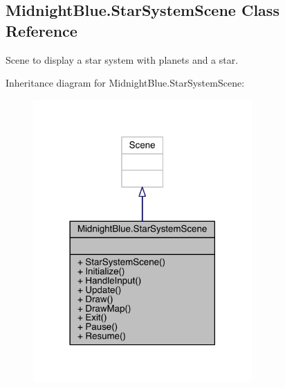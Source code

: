 \hypertarget{class_midnight_blue_1_1_star_system_scene}{}\subsection{Midnight\+Blue.\+Star\+System\+Scene Class Reference}
\label{class_midnight_blue_1_1_star_system_scene}


Scene to display a star system with planets and a star.  




Inheritance diagram for Midnight\+Blue.\+Star\+System\+Scene\+:\nopagebreak
\begin{figure}[H]
\begin{center}
\leavevmode
\includegraphics[width=237pt]{class_midnight_blue_1_1_star_system_scene__inherit__graph}
\end{center}
\end{figure}



